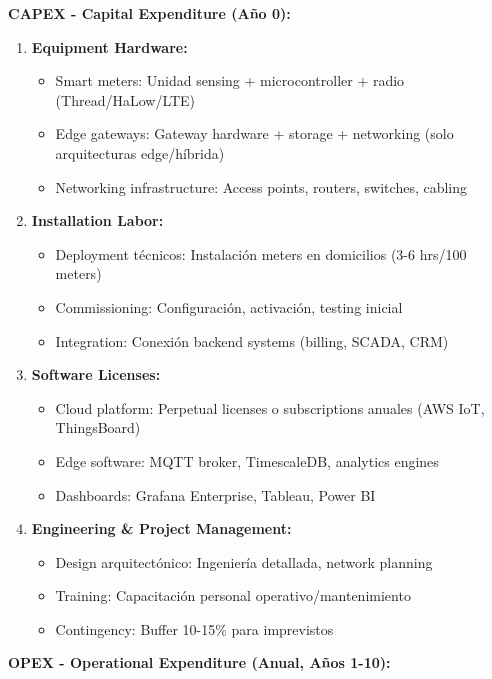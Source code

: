 \textbf{CAPEX - Capital Expenditure (Año 0):}

\begin{enumerate}
\item \textbf{Equipment Hardware:}
   \begin{itemize}
   \item Smart meters: Unidad sensing + microcontroller + radio (Thread/HaLow/LTE)
   \item Edge gateways: Gateway hardware + storage + networking (solo arquitecturas edge/híbrida)
   \item Networking infrastructure: Access points, routers, switches, cabling
   \end{itemize}

\item \textbf{Installation Labor:}
   \begin{itemize}
   \item Deployment técnicos: Instalación meters en domicilios (3-6 hrs/100 meters)
   \item Commissioning: Configuración, activación, testing inicial
   \item Integration: Conexión backend systems (billing, SCADA, CRM)
   \end{itemize}

\item \textbf{Software Licenses:}
   \begin{itemize}
   \item Cloud platform: Perpetual licenses o subscriptions anuales (AWS IoT, ThingsBoard)
   \item Edge software: MQTT broker, TimescaleDB, analytics engines
   \item Dashboards: Grafana Enterprise, Tableau, Power BI
   \end{itemize}

\item \textbf{Engineering \& Project Management:}
   \begin{itemize}
   \item Design arquitectónico: Ingeniería detallada, network planning
   \item Training: Capacitación personal operativo/mantenimiento
   \item Contingency: Buffer 10-15\% para imprevistos
   \end{itemize}
\end{enumerate}

\textbf{OPEX - Operational Expenditure (Anual, Años 1-10):}

